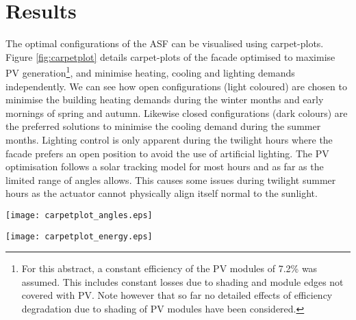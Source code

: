 \chapter{Results}


The optimal configurations of the ASF can be visualised using carpet-plots. Figure \ref{fig:carpetplot} details carpet-plots of the facade optimised to maximise PV generation\footnote{For this abstract, a constant efficiency of the PV modules of 7.2\% was assumed. This includes constant losses due to shading and module edges not covered with PV. Note however that so far no detailed effects of efficiency degradation due to shading of PV modules have been considered.}, and minimise heating, cooling and lighting demands independently. We can see how open configurations (light coloured) are chosen to minimise the building heating demands during the winter months and early mornings of spring and autumn. Likewise closed configurations (dark colours) are the preferred solutions to minimise the cooling demand during the summer months. Lighting control is only apparent during the twilight hours where the facade prefers an open position to avoid the use of artificial lighting. The PV optimisation follows a solar tracking model for most hours and as far as the limited range of angles allows. This causes some issues during twilight summer hours as the actuator cannot physically align itself normal to the sunlight. 




\begin{figure*}
\begin{center}
\texttt{[image: carpetplot\_angles.eps]}
\caption{Carpet plots detailing the optimal configuration to minimise the (a) heating demand, (b) cooling demand, (c) lighting demand, and (d) maximise irradiance on PV panels. Each configuration is represented by an angle of orientation around the x-axis (Altitude) and y-axis (Azimuth) as seen in the legend. Figure (e) details the combinations for optimum building thermal management without PV production. (f) also includes the PV production}
\label{fig:carpetplot}
\end{center}
\end{figure*}

\begin{figure*}
\begin{center}
\texttt{[image: carpetplot\_energy.eps]}
\caption{Carpet plots detailing the net energy consumption. Each square represents the total energy consumption for that specific hour of the entire month. Red colours detail the energy demand, while blue colours detail the energy supply.}
\label{fig:carpetplot_energy}
\end{center}
\end{figure*}



